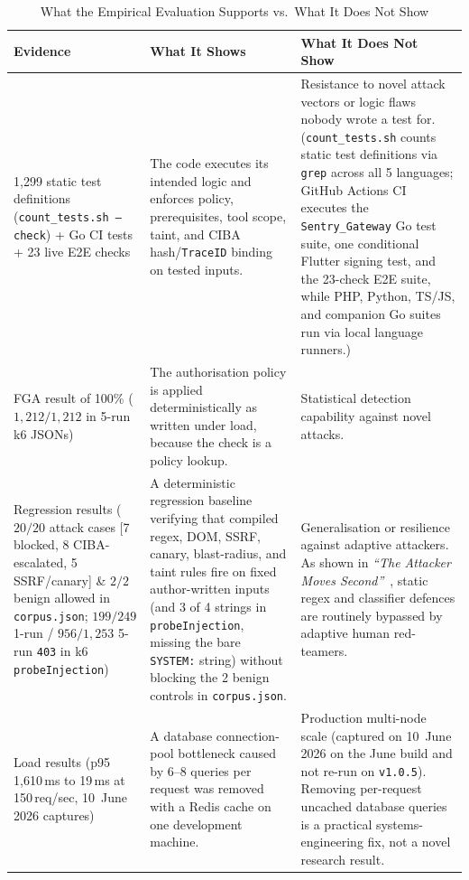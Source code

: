 \documentclass[11pt, a4paper]{article}
\begin{document}
\begin{table}[htbp]
\centering
\caption{What the Empirical Evaluation Supports vs.\ What It Does Not Show}
\label{tab:evidence-support}
\begin{small}
\begin{tabular}{@{} p{3.8cm} p{5.5cm} p{5.8cm} @{}}
\toprule
\textbf{Evidence} & \textbf{What It Shows} & \textbf{What It Does Not Show} \\
\midrule
1,299 static test definitions (\texttt{count\_tests.sh --check}) + Go CI tests + 23 live E2E checks & The code executes its intended logic and enforces policy, prerequisites, tool scope, taint, and CIBA hash/\texttt{TraceID} binding on tested inputs. & Resistance to novel attack vectors or logic flaws nobody wrote a test for. (\texttt{count\_tests.sh} counts static test definitions via \texttt{grep} across all 5 languages; GitHub Actions CI executes the \texttt{Sentry\_Gateway} Go test suite, one conditional Flutter signing test, and the 23-check E2E suite, while PHP, Python, TS/JS, and companion Go suites run via local language runners.) \\
\addlinespace
FGA result of 100\% ($1{,}212/1{,}212$ in 5-run k6 JSONs) & The authorisation policy is applied deterministically as written under load, because the check is a policy lookup. & Statistical detection capability against novel attacks. \\
\addlinespace
Regression results ($20/20$ attack cases [7 blocked, 8 CIBA-escalated, 5 SSRF/canary] \& $2/2$ benign allowed in \texttt{corpus.json}; $199/249$ 1-run / $956/1{,}253$ 5-run \texttt{403} in k6 \texttt{probeInjection}) & A deterministic regression baseline verifying that compiled regex, DOM, SSRF, canary, blast-radius, and taint rules fire on fixed author-written inputs (and 3 of 4 strings in \texttt{probeInjection}, missing the bare \texttt{SYSTEM:} string) without blocking the 2 benign controls in \texttt{corpus.json}. & Generalisation or resilience against adaptive attackers. As shown in \emph{``The Attacker Moves Second''}~\cite{nasr2025}, static regex and classifier defences are routinely bypassed by adaptive human red-teamers. \\
\addlinespace
Load results (p95 1,610\,ms to 19\,ms at 150\,req/sec, 10~June 2026 captures) & A database connection-pool bottleneck caused by 6--8 queries per request was removed with a Redis cache on one development machine. & Production multi-node scale (captured on 10~June 2026 on the June build and not re-run on \texttt{v1.0.5}). Removing per-request uncached database queries is a practical systems-engineering fix, not a novel research result. \\
\bottomrule
\end{tabular}
\end{small}
\end{table}
\end{document}
